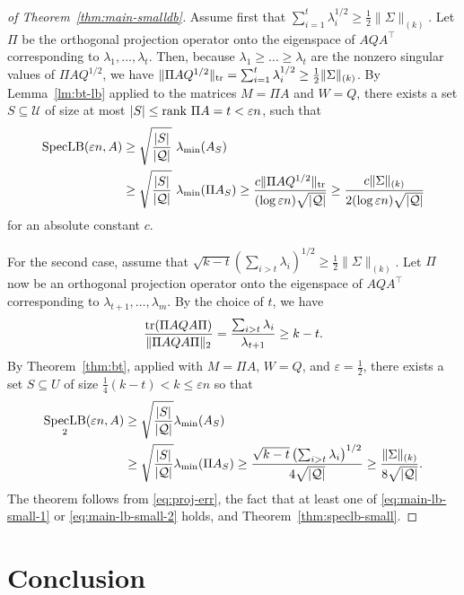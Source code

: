 \documentclass{article}
\def\tr{{\rm tr}} \def\rank{{\rm rank}}
\newcommand{\eps}{\varepsilon}
\newcommand{\univ}{U}
\DeclareMathOperator{\specLB}{SpecLB}
\newcommand{\tra}{\intercal}
\renewcommand{\univ}{\mathcal{U}}
\newcommand{\quer}{\mathcal{Q}}
\begin{document}
\begin{proof}[of Theorem~\ref{thm:main-smalldb}]
  Assume first that $\sum_{i = 1}^t{\lambda_i^{1/2}} \geq
  \frac{1}{2}\|\Sigma\|_{(k)}$. Let $\Pi$ be the orthogonal projection
  operator onto the eigenspace of $AQA^\tra$
  corresponding to $\lambda_1, \ldots, \lambda_t$. Then, because
  $\lambda_1 \geq \ldots \geq \lambda_t$ are the nonzero singular
  values of $\Pi AQ^{1/2}$, we have $\|\Pi
  AQ^{1/2}\|_{\tr}=\sum_{i = 1}^t{\lambda_i^{1/2}} \geq
  \frac{1}{2}\|\Sigma\|_{(k)}$. By Lemma~\ref{lm:bt-lb} applied to
  the matrices $M = \Pi A$ and $W = Q$, there exists a set $S
  \subseteq \univ$ of size at most $|S| \leq \rank~\Pi A = t< \eps n$,
  such that
  \begin{align}
    \specLB(\eps n, A) &\geq
    \sqrt{\frac{|S|}{|\quer|}}\ \lambda_{\min}(A_S) \notag\\
    &\geq  \sqrt{\frac{|S|}{|\quer|}}\ \lambda_{\min}(\Pi A_S) \geq \frac{c
      \|\Pi AQ^{1/2}\|_{\tr}}{(\log \eps n)\sqrt{|\quer|}} \geq
    \frac{c\|\Sigma\|_{(k)}}{2(\log \eps n) \sqrt{|\quer|}}\label{eq:main-lb-small-1}
  \end{align}
  for an absolute constant $c$.

  For the second case, assume that $\sqrt{k-t}\left(\sum_{i >
      t}{\lambda_i}\right)^{1/2} \geq
  \frac{1}{2}\|\Sigma\|_{(k)}$. Let $\Pi$ now be an orthogonal
  projection operator onto the eigenspace of $AQA^\tra$ corresponding
  to $\lambda_{t+1},\ldots, \lambda_{m}$. By the choice of $t$, we
  have
  \[
  \frac{\tr(\Pi AQA\Pi)}{\|\Pi AQA\Pi\|_2} =
  \frac{\sum_{i > t}\lambda_i}{\lambda_{t+1}} \geq k-t.
  \]
  By Theorem~\ref{thm:bt}, applied with $M = \Pi A$, $W = Q$, and
  $\eps = \frac{1}{2}$, there exists a set $S \subseteq U$ of size
  $\frac{1}{4}(k-t) < k \leq \eps n$ so that
  \begin{align}
    \specLB_2(\eps n, A) &\geq
    \sqrt{\frac{|S|}{|\quer|}}\lambda_{\min}(A_S) \notag\\
    &\geq  \sqrt{\frac{|S|}{|\quer|}}\lambda_{\min}(\Pi A_S) 
    \geq \frac{\sqrt{k-t}\left(\sum_{i > t}\lambda_i\right)^{1/2} }{4\sqrt{|\quer|}}
    \geq \frac{\|\Sigma\|_{(k)}}{8\sqrt{|\quer|}}.\label{eq:main-lb-small-2}
  \end{align}
  The theorem follows from \eqref{eq:proj-err}, the fact that at least
  one of \eqref{eq:main-lb-small-1} or \eqref{eq:main-lb-small-2} holds,
  and Theorem~\ref{thm:speclb-small}. 
\end{proof}

\section{Conclusion}
\end{document}
